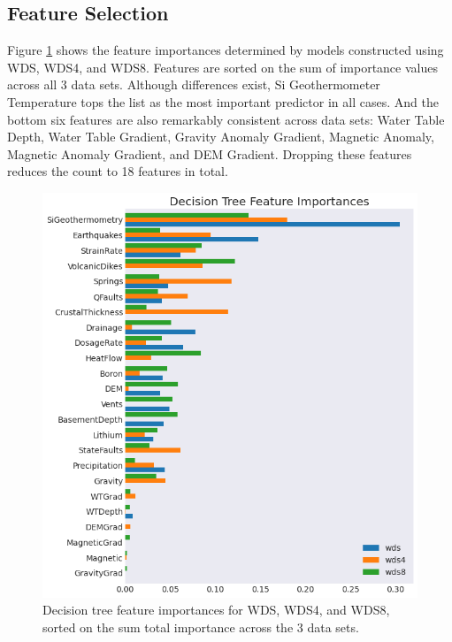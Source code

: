 \subsection{Feature Selection}\label{ch5:dtree_feat_selection}
Figure \ref{fig:dtree_feat_import} shows the feature importances determined by models constructed using WDS, WDS4, and WDS8. Features are sorted on the sum of importance values across all 3 data sets. Although differences exist, Si Geothermometer Temperature tops the list as the most important predictor in all cases. And the bottom six features are also remarkably consistent across data sets: Water Table Depth, Water Table Gradient, Gravity Anomaly Gradient, Magnetic Anomaly, Magnetic Anomaly Gradient, and DEM Gradient. Dropping these features reduces the count to 18 features in total.

\begin{figure}[!htp]
\centering
\includegraphics[width=\textwidth]{templates/images/Figure-DT_feature_importances_all.png}
\caption[Decision tree feature importances]{Decision tree feature importances for WDS, WDS4, and WDS8, sorted on the sum total importance across the 3 data sets.}
\label{fig:dtree_feat_import}
\end{figure}

